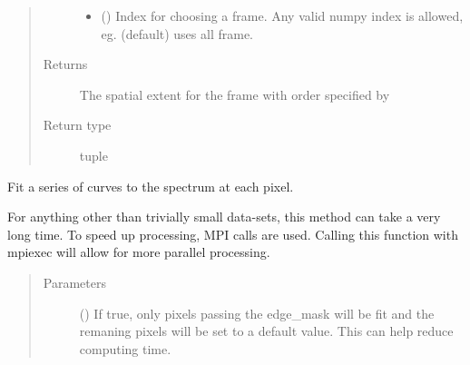 \documentclass[letterpaper,10pt,english]{sphinxmanual}
\begin{document}
\begin{fulllineitems}
\begin{fulllineitems}
\begin{quote}
\begin{description}
\begin{itemize}
\item {} 
 (\sphinxstyleliteralemphasis{, }) \textendash{} Index for choosing a frame. Any valid numpy index is
allowed, eg.  (default) uses all frame.

\end{itemize}

\item[{Returns}] \leavevmode
{} \textendash{} The spatial extent for the frame with order specified by

\item[{Return type}] \leavevmode
tuple

\end{description}\end{quote}

\end{fulllineitems}


\begin{fulllineitems}
\label{\detokenize{xanespy:xanespy.xanes_frameset.XanesFrameset.extent_array}}
\end{fulllineitems}


\begin{fulllineitems}
\label{\detokenize{xanespy:xanespy.xanes_frameset.XanesFrameset.fit_spectra}}
Fit a series of curves to the spectrum at each pixel.

For anything other than trivially small data-sets, this method
can take a very long time. To speed up processing, MPI calls
are used. Calling this function with mpiexec will allow for
more parallel processing.
\begin{quote}\begin{description}
\item[{Parameters}] \leavevmode
{} (\sphinxstyleliteralemphasis{, }) \textendash{} If true, only pixels passing the edge\_mask will be fit and
the remaning pixels will be set to a default value. This can
help reduce computing time.


\end{description}
\end{quote}
\end{fulllineitems}
\end{fulllineitems}
\end{document}
